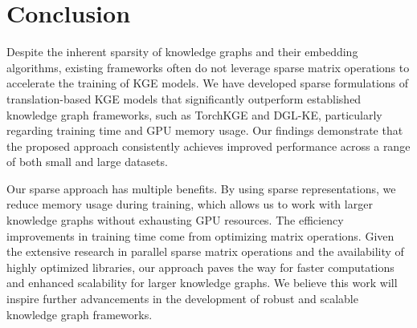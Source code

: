\section{Conclusion}

Despite the inherent sparsity of knowledge graphs and their embedding algorithms, existing frameworks often do not leverage sparse matrix operations to accelerate the training of KGE models. 
We have developed sparse formulations of translation-based KGE models that significantly outperform established knowledge graph frameworks, such as TorchKGE and DGL-KE, particularly regarding training time and GPU memory usage. Our findings demonstrate that the proposed approach consistently achieves improved performance across a range of both small and large datasets.

Our sparse approach has multiple benefits. By using sparse representations, we reduce memory usage during training, which allows us to work with larger knowledge graphs without exhausting GPU resources. The efficiency improvements in training time come from optimizing matrix operations.
Given the extensive research in parallel sparse matrix operations and the availability of highly optimized libraries, our approach paves the way for faster computations and enhanced scalability for larger knowledge graphs. We believe this work will inspire further advancements in the development of robust and scalable knowledge graph frameworks.